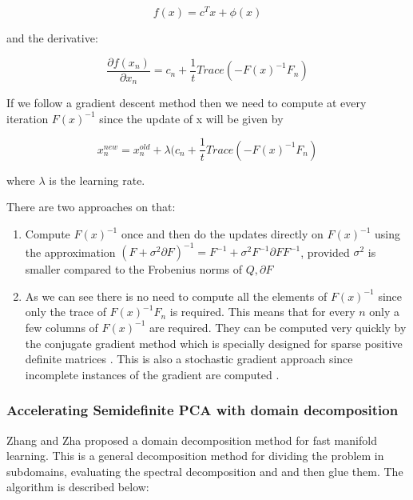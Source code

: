 \documentclass[12pt,letterpaper,doublespaced,ETD,dvips,proposal]{gtthesis}
\begin{document}
\begin{Body}
\begin{equation}
f(x)=c^Tx+\phi(x)
\end{equation}

and the derivative:

\begin{equation}
\frac{\partial f(x_n)}{\partial x_{n}} = c_n
+\frac{1}{t}Trace(-F(x)^{-1}F_n)
\end{equation}

If we follow a gradient descent method then we need to compute at
every iteration $F(x)^{-1}$ since the update of x will be given by

\begin{equation}
x_{n}^{new}=x_{n}^{old}+\lambda (c_n
+\frac{1}{t}Trace(-F(x)^{-1}F_n)
\end{equation}

where $\lambda$ is the learning rate.

There are two approaches on that:
\begin{enumerate}
  \item Compute $F(x)^{-1}$ once and then do the updates directly on
  $F(x)^{-1}$ using the approximation $(F+ \sigma^2\partial F)^{-1}
  = F^{-1} + \sigma^2 F^{-1}\partial F F^{-1}$, provided $\sigma^2$
  is smaller compared to the Frobenius norms of $Q, \partial F$
  \item As we can see there is no need to compute all the elements
  of $F(x)^{-1}$ since only the trace of $F(x)^{-1}F_n$ is required.
  This means that for every $n$ only a few columns of $F(x)^{-1}$
  are required. They can be computed very quickly by the conjugate
  gradient method \cite{saad2003ims} which is specially designed for sparse positive
  definite matrices \cite{saad2003ims}. This is also a stochastic gradient approach since 
  incomplete instances of the gradient are computed \cite{spall2003iss}.
\end{enumerate}

\subsubsection{Accelerating Semidefinite PCA with domain
decomposition}

Zhang and Zha  \cite{zhang:ddm} proposed a domain decomposition method for fast
manifold learning. This is a general decomposition method for
dividing the problem in subdomains, evaluating the spectral
decomposition and and then glue them. The algorithm is described
below:

\vspace{1cm}


\end{Body}
\end{document}
